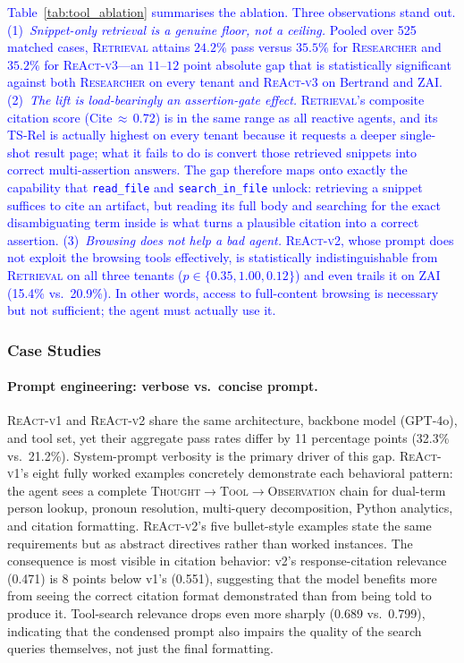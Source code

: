 \textcolor{blue}{Table~\ref{tab:tool_ablation} summarises the ablation. Three observations stand out. (1)~\emph{Snippet-only retrieval is a genuine floor, not a ceiling.} Pooled over 525 matched cases, \textsc{Retrieval} attains $24.2\%$ pass versus $35.5\%$ for \textsc{Researcher} and $35.2\%$ for \textsc{ReAct-v3}---an $11$--$12$ point absolute gap that is statistically significant against both \textsc{Researcher} on every tenant and \textsc{ReAct-v3} on Bertrand and ZAI. (2)~\emph{The lift is load-bearingly an assertion-gate effect.} \textsc{Retrieval}'s composite citation score (Cite\,$\approx$\,0.72) is in the same range as all reactive agents, and its TS-Rel is actually highest on every tenant because it requests a deeper single-shot result page; what it fails to do is convert those retrieved snippets into correct multi-assertion answers. The gap therefore maps onto exactly the capability that \texttt{read\_file} and \texttt{search\_in\_file} unlock: retrieving a snippet suffices to cite an artifact, but reading its full body and searching for the exact disambiguating term inside is what turns a plausible citation into a correct assertion. (3)~\emph{Browsing does not help a bad agent.} \textsc{ReAct-v2}, whose prompt does not exploit the browsing tools effectively, is statistically indistinguishable from \textsc{Retrieval} on all three tenants ($p\in\{0.35, 1.00, 0.12\}$) and even trails it on ZAI (15.4\% vs.\ 20.9\%). In other words, access to full-content browsing is necessary but not sufficient; the agent must actually use it.}

\subsubsection{Case Studies}
\label{sec:case-studies}

\paragraph{Prompt engineering: verbose vs.\ concise prompt.}
\label{sec:prompt-analysis}
\textsc{ReAct-v1} and \textsc{ReAct-v2} share the same architecture, backbone model (GPT-4o), and tool set, yet their aggregate pass rates differ by 11 percentage points (32.3\% vs.\ 21.2\%). System-prompt verbosity is the primary driver of this gap. \textsc{ReAct-v1}'s eight fully worked examples concretely demonstrate each behavioral pattern: the agent sees a complete \textsc{Thought}$\to$\textsc{Tool}$\to$\textsc{Observation} chain for dual-term person lookup, pronoun resolution, multi-query decomposition, Python analytics, and citation formatting. \textsc{ReAct-v2}'s five bullet-style examples state the same requirements but as abstract directives rather than worked instances. The consequence is most visible in citation behavior: v2's response-citation relevance (0.471) is 8 points below v1's (0.551), suggesting that the model benefits more from seeing the correct citation format demonstrated than from being told to produce it. Tool-search relevance drops even more sharply (0.689 vs.\ 0.799), indicating that the condensed prompt also impairs the quality of the search queries themselves, not just the final formatting.

